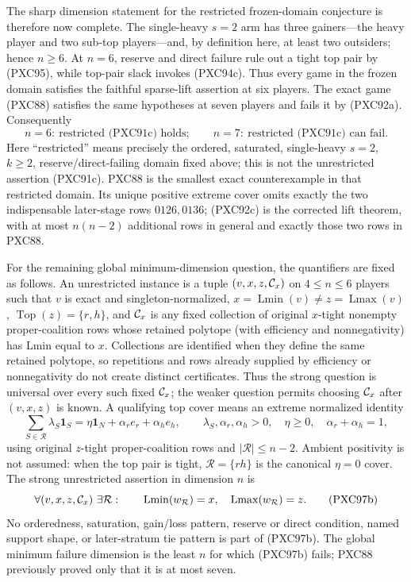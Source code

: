 \documentclass[11pt]{article}
\newcommand{\Lmin}{\operatorname{Lmin}}
\newcommand{\Lmax}{\operatorname{Lmax}}
\newcommand{\one}{\mathbf 1}
\begin{document}
The sharp dimension statement for the restricted frozen-domain conjecture is
therefore now complete.  The single-heavy $s=2$ arm has three gainers---the heavy player
and two sub-top players---and, by definition here, at least two outsiders;
hence $n\ge6$.  At $n=6$, reserve and direct failure rule out a tight top pair
by (PXC95), while top-pair slack invokes (PXC94c).  Thus every game in the
frozen domain satisfies the faithful sparse-lift assertion at six players.
The exact game (PXC88) satisfies the same hypotheses at seven players and
fails it by (PXC92a).  Consequently
\[
 \boxed{\quad n=6:\ \text{restricted (PXC91c) holds};\qquad
              n=7:\ \text{restricted (PXC91c) can fail}.\quad}
                                                        \tag{PXC96}
\]
Here ``restricted'' means precisely the ordered, saturated, single-heavy
$s=2$, $k\ge2$, reserve/direct-failing domain fixed above; this is not the
unrestricted assertion (PXC91c).  PXC88 is the smallest exact counterexample
in that restricted domain.  Its unique
positive extreme cover omits exactly the two indispensable later-stage rows
$0126,0136$; (PXC92c) is the corrected lift theorem, with at most
$n(n-2)$ additional rows in general and exactly those two rows in PXC88.

For the remaining global minimum-dimension question, the quantifiers are
fixed as follows.  An unrestricted instance is a tuple
$(v,x,z,{\cal C}_x)$ on $4\le n\le6$ players such that $v$ is exact and
singleton-normalized, $x=\Lmin(v)\ne z=\Lmax(v)$,
$\operatorname{Top}(z)=\{r,h\}$, and ${\cal C}_x$ is any fixed collection of
original $x$-tight nonempty proper-coalition rows whose retained polytope
(with efficiency and nonnegativity) has Lmin equal to $x$.  Collections are
identified when they define the same retained polytope, so repetitions and
rows already supplied by efficiency or nonnegativity do not create distinct
certificates.  Thus the strong question is
universal over every such fixed ${\cal C}_x$; the weaker question permits
choosing ${\cal C}_x$ after $(v,x,z)$ is known.  A qualifying top cover means
an extreme normalized identity
\[
 \sum_{S\in\mathcal R}\lambda_S\one_S
 =\eta\one_N+\alpha_r e_r+\alpha_h e_h,
 \qquad \lambda_S,\alpha_r,\alpha_h>0,
 \quad \eta\ge0,\quad \alpha_r+\alpha_h=1,
                                                        \tag{PXC97a}
\]
using original $z$-tight proper-coalition rows and
$|\mathcal R|\le n-2$.  Ambient positivity is not assumed: when the top pair
is tight, $\mathcal R=\{rh\}$ is the canonical $\eta=0$ cover.  The strong
unrestricted assertion in dimension $n$ is
\[
 \forall(v,x,z,{\cal C}_x)\ \exists\mathcal R:\qquad
 \Lmin(w_{\mathcal R})=x,
 \quad \Lmax(w_{\mathcal R})=z.                    \tag{PXC97b}
\]
No orderedness, saturation, gain/loss pattern, reserve or direct condition,
named support shape, or later-stratum tie pattern is part of (PXC97b).
The global minimum failure dimension is the least $n$ for which (PXC97b)
fails; PXC88 previously proved only that it is at most seven.
\end{document}
